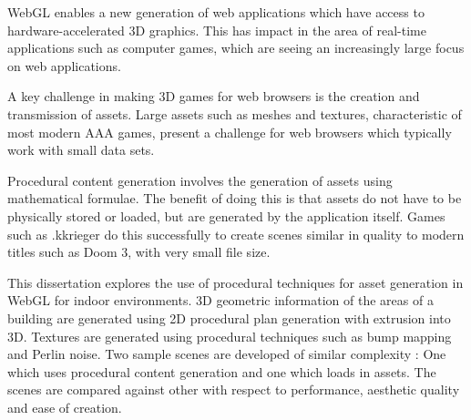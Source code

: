 WebGL enables a new generation of web applications which have access to hardware-accelerated 3D graphics.
This has impact in the area of real-time applications such as computer
games, which are seeing an increasingly large focus on web applications.

A key challenge in making 3D games for web browsers is the creation
and transmission of assets.
Large assets such as meshes and textures, characteristic
of most modern AAA games, present a challenge for web browsers
which typically work with small data sets.

Procedural content generation involves the generation of
assets using mathematical formulae.
The benefit of doing this is that assets do not have to be
physically stored or loaded, but are generated by the application
itself.
Games such as .kkrieger do this successfully to create scenes similar in quality to modern titles such as Doom 3, with very small file size.

This dissertation explores the use of procedural techniques for asset generation in WebGL for indoor environments.
3D geometric information of the areas of a building are generated using 2D procedural plan generation with extrusion into 3D.
Textures are generated using procedural techniques such as bump mapping and Perlin noise.
Two sample scenes are developed of similar complexity :
One which uses procedural content generation and one which loads in assets.
The scenes are compared against other with respect to performance, aesthetic quality and ease of creation.
